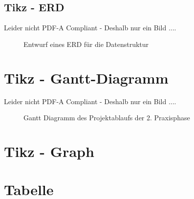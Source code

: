%	
%

\begin{landscape}
	\section{Tikz - ERD}
	Leider nicht PDF-A Compliant - Deshalb nur ein Bild ....
	\begin{figure}[h]
		\centering
		\caption{Entwurf eines ERD für die Datenstruktur}
	\end{figure}
\end{landscape}

\newpage

\section{Tikz - Gantt-Diagramm} \label{a.2.gantt}
Leider nicht PDF-A Compliant - Deshalb nur ein Bild ....
\begin{figure}[h]
	\centering
	\caption{Gantt Diagramm des Projektablaufs der 2. Praxisphase}
\end{figure}
%

\newpage

\section{Tikz - Graph} \label{a.2.graph1}


\newpage

\section{Tabelle} \label{a.2.graph2}
